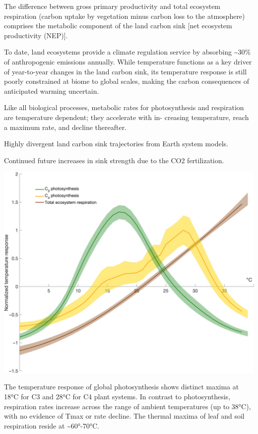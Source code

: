 \documentclass[
]{book}
\begin{document}
The difference between gross primary productivity
and total ecosystem respiration
(carbon uptake by vegetation minus carbon loss to the atmosphere)
comprises the metabolic component of the land carbon
sink {[}net ecosystem productivity (NEP){]}.

To date, land ecosystems provide a climate regulation service
by absorbing \textasciitilde30\% of anthropogenic emissions annually.
While temperature functions as a key driver
of year-to-year changes in the land carbon sink,
its temperature response is still poorly constrained at biome to global scales,
making the carbon consequences of anticipated warming uncertain.

Like all biological processes, metabolic rates for photosynthesis
and respiration are temperature dependent; they accelerate with in-
creasing temperature, reach a maximum rate, and decline thereafter.

Highly divergent land carbon sink trajectories from Earth system models.

Continued future increases in sink strength due to the CO2 fertilization.

\includegraphics{fig/Photosythesis_Temp_Response.jpg}

The temperature response of global photosynthesis
shows distinct maxima at 18°C for C3 and 28°C for C4 plant systems.
In contrast to photosynthesis, respiration rates increase across
the range of ambient temperatures (up to 38°C),
with no evidence of Tmax or rate decline.
The thermal maxima of leaf and soil respiration reside at \textasciitilde60°-70°C.
\end{document}

